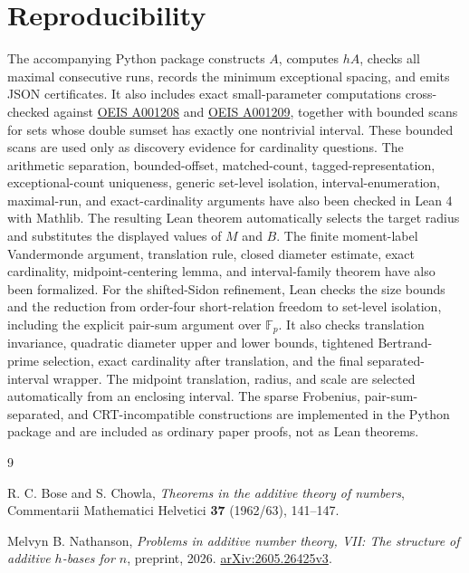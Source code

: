 \documentclass[11pt]{article}
\begin{document}
\section{Reproducibility}

The accompanying Python package constructs $A$, computes $hA$, checks all
maximal consecutive runs, records the minimum exceptional spacing, and emits
JSON certificates. It also includes exact small-parameter computations
cross-checked against \href{https://oeis.org/A001208}{OEIS A001208} and
\href{https://oeis.org/A001209}{OEIS A001209}, together with bounded scans for
sets whose double sumset has exactly one nontrivial interval. These bounded
scans are used only as discovery evidence for cardinality questions. The
arithmetic separation,
bounded-offset, matched-count, tagged-representation, exceptional-count
uniqueness, generic set-level isolation, interval-enumeration, maximal-run,
and exact-cardinality arguments have also been checked in Lean 4 with Mathlib.
The resulting Lean theorem automatically selects the target radius and
substitutes the displayed values of $M$ and $B$. The finite moment-label
Vandermonde argument, translation rule, closed diameter estimate, exact
cardinality, midpoint-centering lemma, and interval-family theorem have also
been formalized. For the shifted-Sidon refinement, Lean checks the size
bounds and the reduction from
order-four short-relation freedom to set-level isolation, including the
explicit pair-sum argument over $\mathbb F_p$. It also checks translation
invariance, quadratic diameter upper and lower bounds, tightened
Bertrand-prime selection, exact cardinality after translation, and the final
separated-interval wrapper. The midpoint translation, radius, and scale are
selected automatically from an enclosing interval. The sparse Frobenius,
pair-sum-separated, and CRT-incompatible constructions are implemented in the
Python package and are included as ordinary paper proofs, not as Lean
theorems.

\begin{thebibliography}{9}

R. C. Bose and S. Chowla,
\emph{Theorems in the additive theory of numbers},
Commentarii Mathematici Helvetici \textbf{37} (1962/63), 141--147.

Melvyn B. Nathanson,
\emph{Problems in additive number theory, VII: The structure of additive
$h$-bases for $n$},
preprint, 2026.
\href{https://arxiv.org/abs/2605.26425}{arXiv:2605.26425v3}.

\end{thebibliography}
\end{document}
